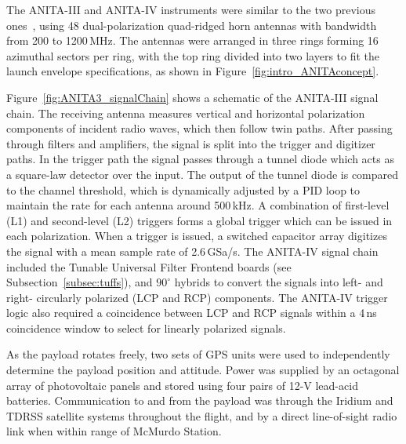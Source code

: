 The ANITA-III and ANITA-IV instruments were similar to the two previous
ones~\cite{ANITA1paper,ANITA2paper}, using 48 dual-polarization quad-ridged horn antennas with bandwidth from 200 to 1200\,MHz. 
The antennas were arranged in three rings forming 16 azimuthal sectors per ring, with the top ring divided into two layers to fit the launch envelope specifications, as shown in Figure~\ref{fig:intro_ANITAconcept}.

Figure~\ref{fig:ANITA3_signalChain} shows a schematic of the ANITA-III signal chain. 
The receiving antenna measures vertical and horizontal polarization components of incident radio waves, which then follow twin paths. 
After passing through filters and amplifiers, the signal is split into
the trigger and digitizer paths.
In the trigger path the signal passes
through a tunnel diode which acts as a square-law detector over the
input. The output of the tunnel diode is compared to the channel
threshold, which is dynamically adjusted by a PID loop to maintain the
rate for each antenna around 500\,kHz. A combination of first-level (L1) and second-level (L2) triggers forms a
global trigger which can be issued in each polarization.
When a trigger is issued, a switched capacitor array digitizes the signal with a mean sample rate of 2.6\,GSa/s. 
The ANITA-IV signal chain included the Tunable Universal Filter Frontend boards (see Subsection~\ref{subsec:tuffs}), and $90^{\circ}$ hybrids to convert the signals into left- and right- circularly polarized (LCP and RCP) components. 
The ANITA-IV trigger logic also required a coincidence between LCP and RCP signals within a 4\,ns coincidence window to select for linearly polarized signals. 

As the payload rotates freely, two sets of GPS units were used to independently determine the
payload position and attitude.
Power was supplied by an octagonal array of photovoltaic panels and stored using four pairs of 12-V lead-acid batteries.
Communication to and from the payload was through the Iridium and TDRSS satellite systems throughout the flight, and by a direct line-of-sight radio link when within range of McMurdo Station.


